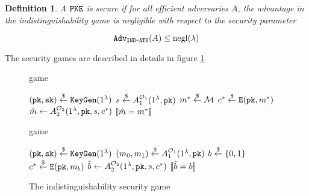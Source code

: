 \documentclass{article}
\newtheorem{definition}{Definition}[section]
\begin{document}
\begin{definition}
    A $\texttt{PKE}$ is  secure if for all efficient adversaries $A$, the advantage in the indistinguishability game is negligible with respect to the security parameter

    \begin{equation*}
        \texttt{Adv}_\texttt{IND-ATK}(A) \leq \operatorname{negl}(\lambda)
    \end{equation*}
\end{definition}

The security games are described in details in figure \ref{fig:sec-games}

\begin{figure}[H]
    \center
    \begin{minipage}{0.49\textwidth}
        \begin{algorithm}[H]
            \caption{ game}\label{alg:ow-atk-game}
            \begin{algorithmic}[1]
                \State $(\texttt{pk}, \texttt{sk}) \stackrel{\$}{\leftarrow} \texttt{KeyGen}(1^\lambda)$
                \State $s \stackrel{\$}{\leftarrow} A_1^{\mathcal{O}_1}(1^\lambda, \texttt{pk})$
                \State $m^\ast \stackrel{\$}{\leftarrow} \mathcal{M}$
                \State $c^\ast \stackrel{\$}{\leftarrow} \texttt{E}(\texttt{pk}, m^\ast)$
                \State $\hat{m} \leftarrow A_2^{\mathcal{O}_2}(1^\lambda, \texttt{pk}, s, c^\ast)$
                \State \Return $[\![ \hat{m} = m^\ast]\!]$
            \end{algorithmic}
        \end{algorithm}
    \end{minipage}
    \hfill
    \begin{minipage}{0.5\textwidth}
        \begin{algorithm}[H]
            \caption{ game}\label{alg:ind-atk-game}
            \begin{algorithmic}[1]
                \State $(\texttt{pk}, \texttt{sk}) \stackrel{\$}{\leftarrow} \texttt{KeyGen}(1^\lambda)$
                \State $(m_0, m_1) \stackrel{\$}{\leftarrow} A_1^{\mathcal{O}_1}(1^\lambda, \texttt{pk})$
                \State $b \stackrel{\$}{\leftarrow} \{0,1\}$
                \State $c^\ast \stackrel{\$}{\leftarrow} \texttt{E}(\texttt{pk}, m_b)$
                \State $\hat{b} \leftarrow A_2^{\mathcal{O}_2}(1^\lambda, \texttt{pk}, s, c^\ast)$
                \State \Return $[\![ \hat{b} = b ]\!]$
            \end{algorithmic}
        \end{algorithm}
    \end{minipage}
    \caption{The indistinguishability security game}\label{fig:sec-games}
\end{figure}
\end{document}
